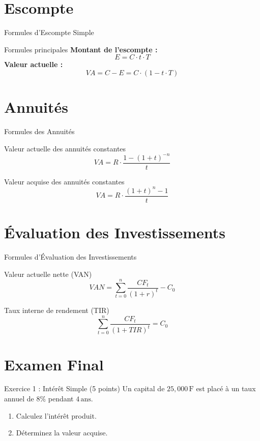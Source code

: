 \documentclass{beamer}
\begin{document}
\section{Escompte}
\begin{frame}{Formules d'Escompte Simple}
    \begin{block}{Formules principales}
        \textbf{Montant de l'escompte :}
        \[
        E = C \cdot t \cdot T
        \]
        \textbf{Valeur actuelle :}
        \[
        VA = C - E = C \cdot (1 - t \cdot T)
        \]
    \end{block}
\end{frame}

\section{Annuités}
\begin{frame}{Formules des Annuités}
    \begin{block}{Valeur actuelle des annuités constantes}
        \[
        VA = R \cdot \frac{1 - (1 + t)^{-n}}{t}
        \]
    \end{block}
    \begin{block}{Valeur acquise des annuités constantes}
        \[
        VA = R \cdot \frac{(1 + t)^n - 1}{t}
        \]
    \end{block}
\end{frame}

\section{Évaluation des Investissements}
\begin{frame}{Formules d'Évaluation des Investissements}
    \begin{block}{Valeur actuelle nette (VAN)}
        \[
        VAN = \sum_{t=0}^n \frac{CF_t}{(1 + r)^t} - C_0
        \]
    \end{block}
    \begin{block}{Taux interne de rendement (TIR)}
        \[
        \sum_{t=0}^n \frac{CF_t}{(1 + TIR)^t} = C_0
        \]
    \end{block}
\end{frame}

\section{Examen Final}
\begin{frame}{Exercice 1 : Intérêt Simple (5 points)}
Un capital de \( 25,000 \, \text{F} \) est placé à un taux annuel de \( 8\% \) pendant \( 4 \, \text{ans} \).
\begin{enumerate}
    \item Calculez l’intérêt produit.
    \item Déterminez la valeur acquise.
\end{enumerate}
\end{frame}
\end{document}
